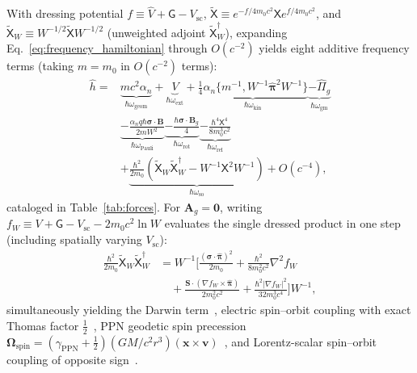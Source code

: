 \documentclass[aps,prl,reprint,superscriptaddress,nofootinbib,floatfix]{revtex4-2}
\theoremstyle{prlthm}
\begin{document}
With dressing potential $f\equiv\hat{V}+\mathsf{G}-V_\text{sc}$, $\tilde{\mathsf{X}}\equiv e^{-f/4m_0c^2}\mathsf{X}e^{f/4m_0c^2}$, and $\tilde{\mathsf{X}}_W\equiv W^{-1/2}\tilde{\mathsf{X}}W^{-1/2}$ (unweighted adjoint $\tilde{\mathsf{X}}_W^\dagger$), expanding Eq.~\eqref{eq:frequency_hamiltonian} through $O(c^{-2})$ yields eight additive frequency terms (taking $m=m_0$ in $O(c^{-2})$ terms):
\begin{equation}
  \begin{aligned}
  \hat{h}={}&\underbrace{mc^2\alpha_n}_{\hbar\omega_\text{geom}}+\underbrace{V}_{\hbar\omega_\text{ext}}+\underbrace{\tfrac{1}{4}\alpha_n\{m^{-1},W^{-1}\hat{\boldsymbol{\pi}}^2W^{-1}\}}_{\hbar\omega_\text{kin}}\underbrace{-\hat{\Pi}_g}_{\hbar\omega_\text{gm}}\\
  &\underbrace{-\frac{\alpha_nq\hbar\boldsymbol{\sigma}\cdot\mathbf{B}}{2mW^2}}_{\hbar\omega_\text{Pauli}}\underbrace{-\frac{\hbar\boldsymbol{\sigma}\cdot\mathbf{B}_g}{4}}_{\hbar\omega_\text{rot}}\underbrace{-\frac{\hbar^4\mathsf{X}^4}{8m_0^3c^2}}_{\hbar\omega_\text{rel}}\\
  &+\underbrace{\frac{\hbar^2}{2m_0}(\tilde{\mathsf{X}}_W\tilde{\mathsf{X}}_W^\dagger-W^{-1}\mathsf{X}^2W^{-1})}_{\hbar\omega_\text{so}}\!+\!O(c^{-4}),
  \end{aligned}
  \label{eq:nr_expansion}
\end{equation}
cataloged in Table~\ref{tab:forces}. For $\mathbf{A}_g=\mathbf{0}$, writing $f_W\equiv V+\mathsf{G}-V_\text{sc}-2m_0c^2\ln W$ evaluates the single dressed product in one step (including spatially varying $V_\text{sc}$):
\begin{equation}
  \begin{aligned}
  \frac{\hbar^2}{2m_0}\tilde{\mathsf{X}}_W\tilde{\mathsf{X}}_W^\dagger&=W^{-1}\!\Big[\frac{(\boldsymbol{\sigma}\cdot\hat{\boldsymbol{\pi}})^2}{2m_0}+\frac{\hbar^2}{8m_0^2c^2}\nabla^2f_W\\
  &\quad+\frac{\mathbf{S}\cdot(\nabla f_W\times\hat{\boldsymbol{\pi}})}{2m_0^2c^2}+\frac{\hbar^2|\nabla f_W|^2}{32m_0^3c^4}\Big]W^{-1},
  \end{aligned}
  \label{eq:dressed_square}
\end{equation}
simultaneously yielding the Darwin term~\citep{Darwin1928Wave}, electric spin--orbit coupling with exact Thomas factor $\tfrac{1}{2}$~\citep{Thomas1926Motion}, PPN geodetic spin precession $\boldsymbol{\Omega}_\text{spin}=(\gamma_\text{PPN}+\tfrac{1}{2})(GM/c^2r^3)(\mathbf{x}\times\mathbf{v})$~\citep{deSitter1916Einstein,Everitt2011Gravity}, and Lorentz-scalar spin--orbit coupling of opposite sign~\citep{SerotWalecka1986Relativistic}.
\end{document}
